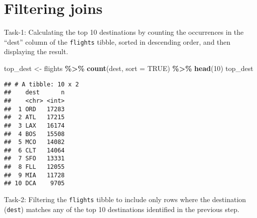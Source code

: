 \documentclass[
]{article}
\newenvironment{Shaded}{\begin{snugshade}}{\end{snugshade}}
\newcommand{\AttributeTok}[1]{\textcolor[rgb]{0.13,0.29,0.53}{#1}}
\newcommand{\ConstantTok}[1]{\textcolor[rgb]{0.56,0.35,0.01}{#1}}
\newcommand{\DecValTok}[1]{\textcolor[rgb]{0.00,0.00,0.81}{#1}}
\newcommand{\FunctionTok}[1]{\textcolor[rgb]{0.13,0.29,0.53}{\textbf{#1}}}
\newcommand{\NormalTok}[1]{#1}
\newcommand{\OtherTok}[1]{\textcolor[rgb]{0.56,0.35,0.01}{#1}}
\newcommand{\SpecialCharTok}[1]{\textcolor[rgb]{0.81,0.36,0.00}{\textbf{#1}}}
\begin{document}
\hypertarget{filtering-joins}{%
\section{Filtering joins}\label{filtering-joins}}

Task-1: Calculating the top 10 destinations by counting the occurrences
in the ``dest'' column of the \texttt{flights} tibble, sorted in
descending order, and then displaying the result.

\begin{Shaded}
\begin{Highlighting}[]
\NormalTok{top\_dest }\OtherTok{\textless{}{-}}\NormalTok{ flights }\SpecialCharTok{\%\textgreater{}\%}
  \FunctionTok{count}\NormalTok{(dest, }\AttributeTok{sort =} \ConstantTok{TRUE}\NormalTok{) }\SpecialCharTok{\%\textgreater{}\%}
  \FunctionTok{head}\NormalTok{(}\DecValTok{10}\NormalTok{)}
\NormalTok{top\_dest}
\end{Highlighting}
\end{Shaded}

\begin{verbatim}
## # A tibble: 10 x 2
##    dest      n
##    <chr> <int>
##  1 ORD   17283
##  2 ATL   17215
##  3 LAX   16174
##  4 BOS   15508
##  5 MCO   14082
##  6 CLT   14064
##  7 SFO   13331
##  8 FLL   12055
##  9 MIA   11728
## 10 DCA    9705
\end{verbatim}

Task-2: Filtering the \texttt{flights} tibble to include only rows where
the destination (\texttt{dest}) matches any of the top 10 destinations
identified in the previous step.

\begin{Shaded}
\end{Shaded}
\end{document}
